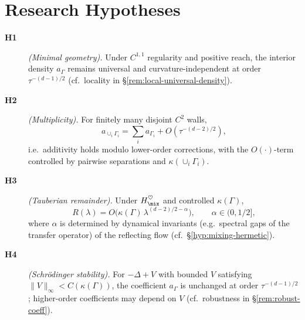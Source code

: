 \medskip

\section{Research Hypotheses}\label{sec:hypotheses}
\begin{description}
  \item[\textbf{H1}]\label{hyp:H1} \textit{(Minimal geometry).}
  Under $C^{1,1}$ regularity and positive reach, the interior density $a_\Gamma$ remains universal and curvature-independent at order $\tau^{-(d-1)/2}$ (cf.\ locality in \S\ref{rem:local-universal-density}).
  \item[\textbf{H2}]\label{hyp:H2} \textit{(Multiplicity).}
  For finitely many disjoint $C^2$ walls,
  \[
  a_{\cup_i\Gamma_i}=\sum_i a_{\Gamma_i}+O(\tau^{-(d-2)/2}),
  \]
  i.e.\ additivity holds modulo lower-order corrections, with the $O(\cdot)$-term controlled by pairwise separations and $\kappa(\cup_i\Gamma_i)$.
  \item[\textbf{H3}]\label{hyp:H3} \textit{(Tauberian remainder).}
  Under $H_{\mix}^{\heartsuit}$ and controlled $\kappa(\Gamma)$,
  \[
  R(\lambda)=O\!\big(\kappa(\Gamma)\,\lambda^{(d-2)/2-\alpha}\big),\qquad \alpha\in(0,1/2],
  \]
  where $\alpha$ is determined by dynamical invariants (e.g.\ spectral gaps of the transfer operator) of the reflecting flow (cf.\ \S\ref{hyp:mixing-hermetic}).
  \item[\textbf{H4}]\label{hyp:H4} \textit{(Schr\"odinger stability).}
  For $-\Delta+V$ with bounded $V$ satisfying $\|V\|_\infty < C(\kappa(\Gamma))$, the coefficient $a_\Gamma$ is unchanged at order $\tau^{-(d-1)/2}$; higher-order coefficients may depend on $V$ (cf.\ robustness in \S\ref{rem:robust-coeff}).
\end{description}

\medskip

